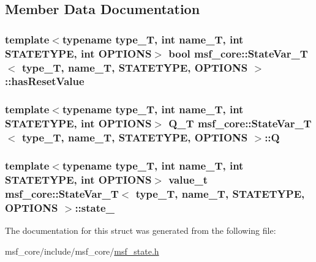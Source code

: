 \subsection{Member Data Documentation}
\hypertarget{structmsf__core_1_1StateVar__T_a60502bb0e8813b19e52dac9dd2a41ab6}{
\subsubsection[{has\-Reset\-Value}]{\setlength{\rightskip}{0pt plus 5cm}template$<$typename type\-\_\-\-T, int name\-\_\-\-T, int S\-T\-A\-T\-E\-T\-Y\-P\-E, int O\-P\-T\-I\-O\-N\-S$>$ bool {\bf msf\-\_\-core\-::\-State\-Var\-\_\-\-T}$<$ type\-\_\-\-T, name\-\_\-\-T, S\-T\-A\-T\-E\-T\-Y\-P\-E, O\-P\-T\-I\-O\-N\-S $>$\-::has\-Reset\-Value}}\label{structmsf__core_1_1StateVar__T_a60502bb0e8813b19e52dac9dd2a41ab6}
\hypertarget{structmsf__core_1_1StateVar__T_a618788b64b890837225f9c71c2b81d5d}{
\subsubsection[{Q}]{\setlength{\rightskip}{0pt plus 5cm}template$<$typename type\-\_\-\-T, int name\-\_\-\-T, int S\-T\-A\-T\-E\-T\-Y\-P\-E, int O\-P\-T\-I\-O\-N\-S$>$ {\bf Q\-\_\-\-T} {\bf msf\-\_\-core\-::\-State\-Var\-\_\-\-T}$<$ type\-\_\-\-T, name\-\_\-\-T, S\-T\-A\-T\-E\-T\-Y\-P\-E, O\-P\-T\-I\-O\-N\-S $>$\-::Q}}\label{structmsf__core_1_1StateVar__T_a618788b64b890837225f9c71c2b81d5d}
\hypertarget{structmsf__core_1_1StateVar__T_abb101cd9e3e72fad81bad441947579fa}{
\subsubsection[{state\-\_\-}]{\setlength{\rightskip}{0pt plus 5cm}template$<$typename type\-\_\-\-T, int name\-\_\-\-T, int S\-T\-A\-T\-E\-T\-Y\-P\-E, int O\-P\-T\-I\-O\-N\-S$>$ {\bf value\-\_\-t} {\bf msf\-\_\-core\-::\-State\-Var\-\_\-\-T}$<$ type\-\_\-\-T, name\-\_\-\-T, S\-T\-A\-T\-E\-T\-Y\-P\-E, O\-P\-T\-I\-O\-N\-S $>$\-::state\-\_\-}}\label{structmsf__core_1_1StateVar__T_abb101cd9e3e72fad81bad441947579fa}


The documentation for this struct was generated from the following file\-:\begin{DoxyCompactItemize}
\item 
msf\-\_\-core/include/msf\-\_\-core/\hyperlink{msf__state_8h}{msf\-\_\-state.\-h}\end{DoxyCompactItemize}
